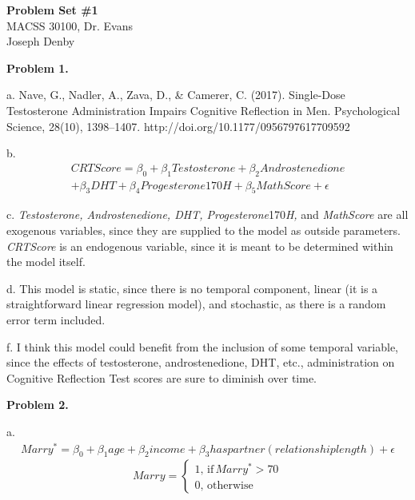 \documentclass[letterpaper,12pt]{article}
\theoremstyle{definition}
\begin{document}
\begin{flushleft}
	\textbf{\large{Problem Set \#1}} \\
	MACSS 30100, Dr. Evans \\
	Joseph Denby
\end{flushleft}

\vspace{3mm}

\noindent\textbf{Problem 1.}

a. Nave, G., Nadler, A., Zava, D., \& Camerer, C. (2017). Single-Dose Testosterone Administration Impairs Cognitive Reflection in Men. Psychological Science, 28(10), 1398–1407. http://doi.org/10.1177/0956797617709592 

b.
\begin{equation*}
\begin{aligned}
  CRTScore = \beta_0 + \beta_1Testosterone + \beta_2Androstenedione \\ 
  + \beta_3DHT + \beta_4Progesterone170H + \beta_5MathScore + \epsilon
\end{aligned}
\end{equation*}

c. \textit{Testosterone, Androstenedione, DHT, Progesterone}170\textit{H,} and \textit{MathScore} are all exogenous variables, since they are supplied to the model as outside parameters. \textit{CRTScore} is an endogenous variable, since it is meant to be determined within the model itself.

d. This model is static, since there is no temporal component, linear (it is a straightforward linear regression model), and stochastic, as there is a random error term included.

f. I think this model could benefit from the inclusion of some temporal variable, since the effects of testosterone, androstenedione, DHT, etc., administration on Cognitive Reflection Test scores are sure to diminish over time. 

\vspace{3mm}

\noindent\textbf{Problem 2.}

a. 
\begin{equation*}
\begin{aligned}
  Marry^* = \beta_0 + \beta_1age + \beta_2income + \beta_3haspartner(relationshiplength) + \epsilon
\end{aligned}
\end{equation*}
\begin{equation*}
Marry = \begin{cases}1, \, \text{if} \, Marry^* > 70 \\ 0, \, \text{otherwise} \end{cases}
\end{equation*}
\end{document}
